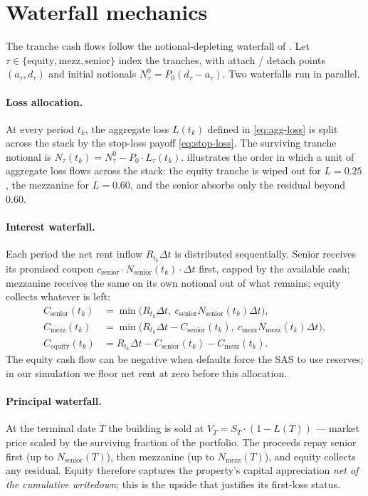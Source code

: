\section{Waterfall mechanics}\label{sec:waterfall}

The tranche cash flows follow the notional-depleting waterfall of
\autocite{AndersenSideniusBasu2003}. Let $\tau \in \{\text{equity},
\text{mezz}, \text{senior}\}$ index the tranches, with attach / detach
points $(a_\tau, d_\tau)$ and initial notionals $N_\tau^0 = P_0 (d_\tau -
a_\tau)$. Two waterfalls run in parallel.

\paragraph{Loss allocation.}
At every period $t_k$, the aggregate loss $L(t_k)$ defined in
\cref{eq:agg-loss} is split across the stack by the stop-loss payoff
\cref{eq:stop-loss}. The surviving tranche notional is $N_\tau(t_k) =
N_\tau^0 - P_0 \cdot L_\tau(t_k)$.  illustrates the
order in which a unit of aggregate loss flows across the stack: the equity
tranche is wiped out for $L = 0.25$, the mezzanine for $L = 0.60$, and the
senior absorbs only the residual beyond $0.60$.

\paragraph{Interest waterfall.}
Each period the net rent inflow $R_{t_k} \Delta t$ is distributed
sequentially. Senior receives its promised coupon
$c_\text{senior} \cdot N_\text{senior}(t_k) \cdot \Delta t$ first, capped
by the available cash; mezzanine receives the same on its own notional out
of what remains; equity collects whatever is left:
\begin{align*}
C_\text{senior}(t_k) &= \min\bigl( R_{t_k}\Delta t,\ c_\text{senior}
N_\text{senior}(t_k) \Delta t \bigr), \\
C_\text{mezz}(t_k) &= \min\bigl( R_{t_k}\Delta t - C_\text{senior}(t_k),\
c_\text{mezz} N_\text{mezz}(t_k) \Delta t \bigr), \\
C_\text{equity}(t_k) &= R_{t_k}\Delta t - C_\text{senior}(t_k) - C_\text{mezz}(t_k).
\end{align*}
The equity cash flow can be negative when defaults force the SAS to use
reserves; in our simulation we floor net rent at zero before this
allocation.

\paragraph{Principal waterfall.}
At the terminal date $T$ the building is sold at $V_T = S_T \cdot (1 -
L(T))$ --- market price scaled by the surviving fraction of the portfolio.
The proceeds repay senior first (up to $N_\text{senior}(T)$), then
mezzanine (up to $N_\text{mezz}(T)$), and equity collects any residual.
Equity therefore captures the property's capital appreciation \emph{net of
the cumulative writedown}; this is the upside that justifies its first-loss
status.

